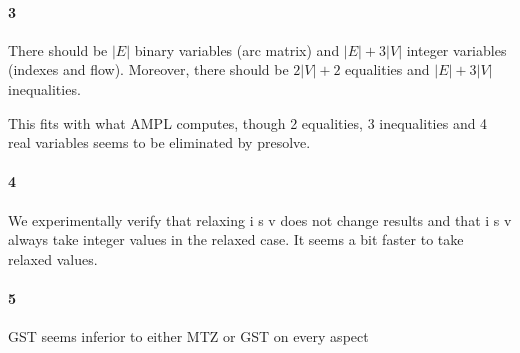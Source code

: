 \documentclass{article}
\begin{document}
\paragraph{3}

There should be $|E|$ binary variables (arc matrix) and $|E|+3|V|$ integer variables (indexes and flow). Moreover, there should be $2|V|+2$ equalities and $|E|+3|V|$ inequalities.

This fits with what AMPL computes, though 2 equalities, 3 inequalities and 4 real variables seems to be eliminated by presolve.

\paragraph{4}

We experimentally verify that relaxing i s v does not change results and that i
s v always take integer values in the relaxed case. It seems a bit faster to
take relaxed values.

\paragraph{5}

GST seems inferior to either MTZ or GST on every aspect
\end{document}
